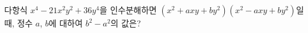 다항식 $x^4-21x^2y^2+36y^4$을 인수분해하면 $(x^2+axy+by^2)(x^2-axy+by^2)$일 때, 정수 $a$, $b$에 대하여 $b^2-a^2$의 값은?
